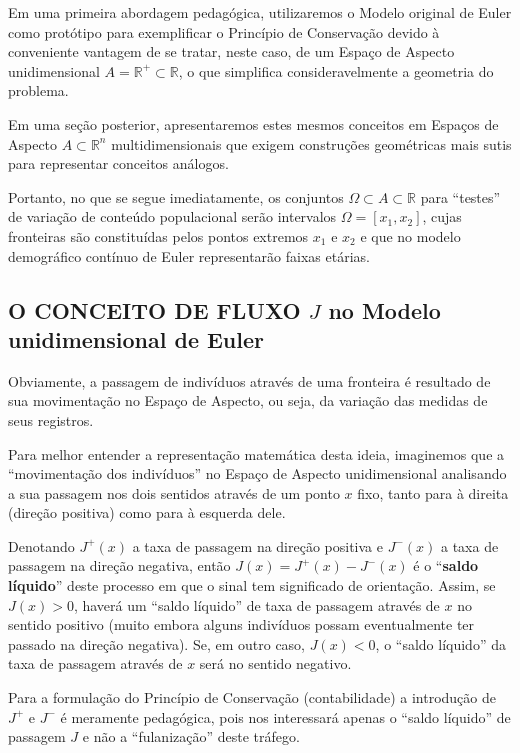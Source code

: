 Em uma primeira abordagem pedagógica, utilizaremos o Modelo original de Euler como protótipo para exemplificar o Princípio de Conservação devido à conveniente vantagem de se tratar, neste caso, de um Espaço de Aspecto unidimensional \(A = \mathbb{R}^+ \subset \mathbb{R}\), o que simplifica consideravelmente a geometria do problema.

Em uma seção posterior, apresentaremos estes mesmos conceitos em Espaços de Aspecto \(A \subset \mathbb{R}^n\) multidimensionais que exigem construções geométricas mais sutis para representar conceitos análogos.

Portanto, no que se segue imediatamente, os conjuntos \(\Omega \subset A \subset \mathbb{R}\) para ``testes'' de variação de conteúdo populacional serão intervalos \(\Omega = [x_1, x_2]\), cujas fronteiras são constituídas pelos pontos extremos \(x_1\) e \(x_2\) e que no modelo demográfico contínuo de Euler representarão faixas etárias.

\subsection{O CONCEITO DE FLUXO \(J\) no Modelo unidimensional de Euler}

Obviamente, a passagem de indivíduos através de uma fronteira é resultado de sua movimentação no Espaço de Aspecto, ou seja, da variação das medidas de seus registros.
 
Para melhor entender a representação matemática desta ideia, imaginemos que a ``movimentação dos indivíduos'' no Espaço de Aspecto unidimensional analisando a sua passagem nos dois sentidos através de um ponto \(x\) fixo, tanto para à direita (direção positiva) como para à esquerda dele.

Denotando \(J^+(x)\) a taxa de passagem na direção positiva e \(J^-(x)\) a taxa de passagem na direção negativa, então \(J(x) = J^+(x) - J^-(x)\) é o ``\textbf{saldo líquido}'' deste processo em que o sinal tem significado de orientação. Assim, se \(J(x) > 0\), haverá um ``saldo líquido'' de taxa de passagem através de \(x\) no sentido positivo (muito embora alguns indivíduos possam eventualmente ter passado na direção negativa). Se, em outro caso, \(J(x) < 0\), o ``saldo líquido'' da taxa de passagem através de \(x\) será no sentido negativo.

Para a formulação do Princípio de Conservação (contabilidade) a introdução de \(J^+\) e \(J^-\) é meramente pedagógica, pois nos interessará apenas o ``saldo líquido'' de passagem \(J\) e não a ``fulanização'' deste tráfego.


